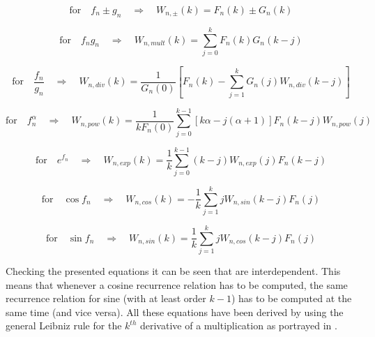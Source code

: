 \begin{equation} \label{eq:recRel1}
\text{for} \quad f_{n} \pm g_{n} \quad \Rightarrow \quad W_{n,\pm}\left(k\right)= F_{n}\left(k\right) \pm G_{n}\left(k\right)
\end{equation}

\begin{equation} \label{eq:recRel2}
\text{for} \quad f_{n}g_{n} \quad \Rightarrow \quad W_{n,mult}\left(k\right)=\displaystyle\sum_{j=0}^{k}F_{n}\left(k\right)G_{n}\left(k-j\right)
\end{equation}

\begin{equation} \label{eq:recRel3}
\text{for} \quad \dfrac{f_{n}}{g_{n}} \quad \Rightarrow \quad W_{n,div}\left(k\right)= \dfrac{1}{G_{n}\left(0\right)}\left[F_{n}\left(k\right)-\displaystyle\sum_{j=1}^{k}G_{n}\left(j\right)W_{n,div}\left(k-j\right) \right]
\end{equation}

\begin{equation} \label{eq:recRel4}
\text{for} \quad f_{n}^{\alpha} \quad \Rightarrow \quad W_{n,pow}\left(k\right)= \dfrac{1}{kF_{n}\left(0\right)} \displaystyle\sum_{j=0}^{k-1}\left[k\alpha-j\left(\alpha+1\right)\right] F_{n}\left(k-j\right)W_{n,pow}\left(j\right) 
\end{equation}

\begin{equation} \label{eq:recRel5}
\text{for} \quad e^{f_{n}} \quad \Rightarrow \quad W_{n,exp}\left(k\right)= \dfrac{1}{k}\displaystyle\sum_{j=0}^{k-1}\left(k-j\right)W_{n,exp}\left(j\right)F_{n}\left(k-j\right)
\end{equation}

\begin{equation} \label{eq:recRel6}
\text{for} \quad \cos f_{n} \quad \Rightarrow \quad W_{n,cos}\left(k\right)= -\dfrac{1}{k}\displaystyle\sum_{j=1}^{k}jW_{n,sin}\left(k-j\right)F_{n}\left(j\right)
\end{equation}

\begin{equation} \label{eq:recRel7}
\text{for} \quad \sin f_{n}  \quad \Rightarrow \quad W_{n,sin}\left(k\right)= \dfrac{1}{k}\displaystyle\sum_{j=1}^{k}jW_{n,cos}\left(k-j\right)F_{n}\left(j\right)
\end{equation}

Checking the presented equations it can be seen that  are interdependent. This means that whenever a cosine recurrence relation has to be computed, the same recurrence relation for sine (with at least order $k-1$) has to be computed at the same time (and vice versa). All these equations have been derived by \cite{jorba2005software} using the general Leibniz rule for the $k^{th}$ derivative of a multiplication as portrayed in .

